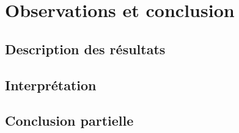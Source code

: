\section{Observations et conclusion}
\subsection{Description des résultats}
\subsection{Interprétation}
\subsection{Conclusion partielle}